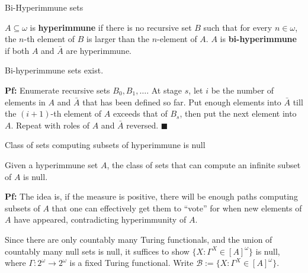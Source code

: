 \begin{frame}{Bi-Hyperimmune sets}
  \begin{define}
    $A\subseteq\omega$ is \textbf{hyperimmune} if there is no recursive set
    $B$ such that for every $n\in\omega$, the $n$-th element of $B$ is
    larger than the $n$-element of $A$. $A$ is \textbf{bi-hyperimmune} if
    both $A$ and $\bar{A}$ are hyperimmune.
  \end{define}

  \begin{thm}
    Bi-hyperimmune sets exist.
  \end{thm}

  \vspace{0.5em}
  \textbf{Pf:} Enumerate recursive sets $B_0,B_1,\ldots$. At stage $s$, let
  $i$ be the number of elements in $A$ and $\bar{A}$ that has been defined
  so far. Put enough elements into $\bar{A}$ till the $(i+1)$-th element of
  $A$ exceeds that of $B_s$, then put the next element into $A$. Repeat
  with roles of $A$ and $\bar{A}$ reversed. $\blacksquare$
\end{frame}

\begin{frame}{Class of sets computing subsets of hyperimmune is null}
  \begin{thm}
    \label{thm:bihyper-null}
    Given a hyperimmune set $A$, the class of sets that can compute an
    infinite subset of $A$ is null.
  \end{thm}

  \vspace{1em}
  \textbf{Pf:} The idea is, if the measure is positive, there will be
  enough paths computing subsets of $A$ that one can effectively get them
  to ``vote'' for when new elements of $A$ have appeared, contradicting
  hyperimmunity of $A$.

  \vspace{1em}
  Since there are only countably many Turing functionals, and the union of
  countably many null sets is null, it suffices to show $\{X:
  \Gamma^X\in[A]^\omega\}$ is null, where
  $\Gamma:2^\omega\rightarrow2^\omega$ is a fixed Turing functional.
  Write $\mathcal{B} :=\{X: \Gamma^X\in[A]^\omega\}$.
\end{frame}

